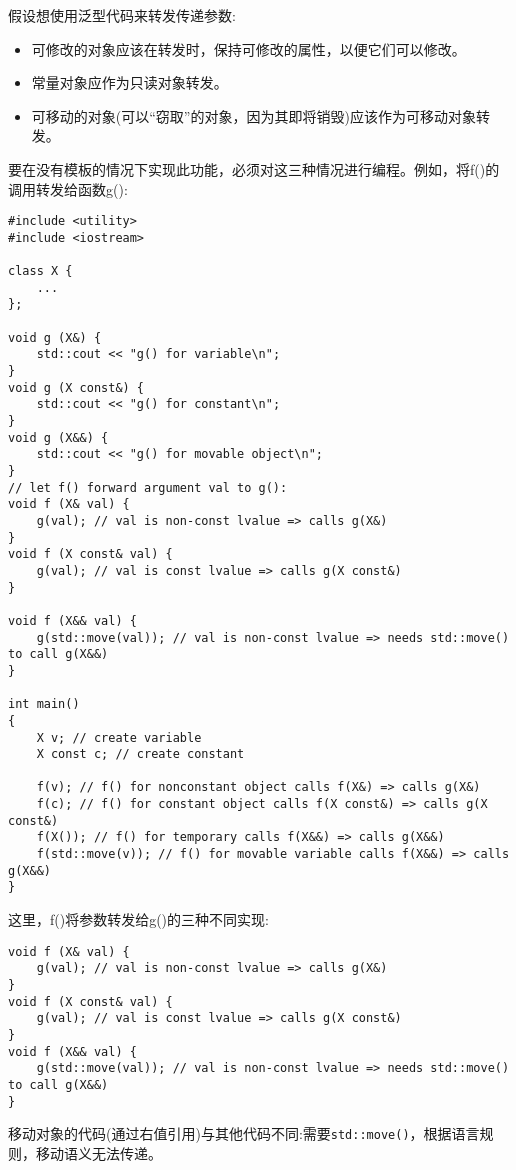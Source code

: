 假设想使用泛型代码来转发传递参数:

\begin{itemize}
\item 
可修改的对象应该在转发时，保持可修改的属性，以便它们可以修改。

\item 
常量对象应作为只读对象转发。

\item 
可移动的对象(可以“窃取”的对象，因为其即将销毁)应该作为可移动对象转发。
\end{itemize}

要在没有模板的情况下实现此功能，必须对这三种情况进行编程。例如，将f()的调用转发给函数g():

\begin{lstlisting}[style=styleCXX]
#include <utility>
#include <iostream>

class X {
	...
};

void g (X&) {
	std::cout << "g() for variable\n";
}
void g (X const&) {
	std::cout << "g() for constant\n";
}
void g (X&&) {
	std::cout << "g() for movable object\n";
}
// let f() forward argument val to g():
void f (X& val) {
	g(val); // val is non-const lvalue => calls g(X&)
}
void f (X const& val) {
	g(val); // val is const lvalue => calls g(X const&)
}

void f (X&& val) {
	g(std::move(val)); // val is non-const lvalue => needs std::move() to call g(X&&)
}

int main()
{
	X v; // create variable
	X const c; // create constant
	
	f(v); // f() for nonconstant object calls f(X&) => calls g(X&)
	f(c); // f() for constant object calls f(X const&) => calls g(X const&)
	f(X()); // f() for temporary calls f(X&&) => calls g(X&&)
	f(std::move(v)); // f() for movable variable calls f(X&&) => calls g(X&&)
}
\end{lstlisting}

这里，f()将参数转发给g()的三种不同实现:

\begin{lstlisting}[style=styleCXX]
void f (X& val) {
	g(val); // val is non-const lvalue => calls g(X&)
}
void f (X const& val) {
	g(val); // val is const lvalue => calls g(X const&)
}
void f (X&& val) {
	g(std::move(val)); // val is non-const lvalue => needs std::move() to call g(X&&)
}
\end{lstlisting}

移动对象的代码(通过右值引用)与其他代码不同:需要\texttt{std::move()}，根据语言规则，移动语义无法传递。

